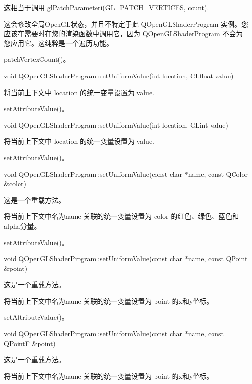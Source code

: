 这相当于调用 glPatchParameteri(GL\_PATCH\_VERTICES, count).

\begin{notice}
这会修改全局OpenGL状态，并且不特定于此 QOpenGLShaderProgram 实例。您应该在需要时在您的渲染函数中调用它，因为 QOpenGLShaderProgram 不会为您应用它。这纯粹是一个遍历功能。
\end{notice}

\begin{seeAlso}
patchVertexCount()。
\end{seeAlso}

void QOpenGLShaderProgram::setUniformValue(int location, GLfloat value)

将当前上下文中 location 的统一变量设置为 value.



\begin{seeAlso}
setAttributeValue()。
\end{seeAlso}

void QOpenGLShaderProgram::setUniformValue(int location, GLint value)

将当前上下文中 location 的统一变量设置为 value.


\begin{seeAlso}
setAttributeValue()。
\end{seeAlso}

void QOpenGLShaderProgram::setUniformValue(const char *name, const QColor \&color)

这是一个重载方法。

将当前上下文中名为name 关联的统一变量设置为 color 的红色、绿色、蓝色和alpha分量。


\begin{seeAlso}
setAttributeValue()。
\end{seeAlso}

void QOpenGLShaderProgram::setUniformValue(const char *name, const QPoint \&point)

这是一个重载方法。

将当前上下文中名为name 关联的统一变量设置为 point 的x和y坐标。

\begin{seeAlso}
setAttributeValue()。
\end{seeAlso}

void QOpenGLShaderProgram::setUniformValue(const char *name, const QPointF \&point)

这是一个重载方法。

将当前上下文中名为name 关联的统一变量设置为 point 的x和y坐标。


